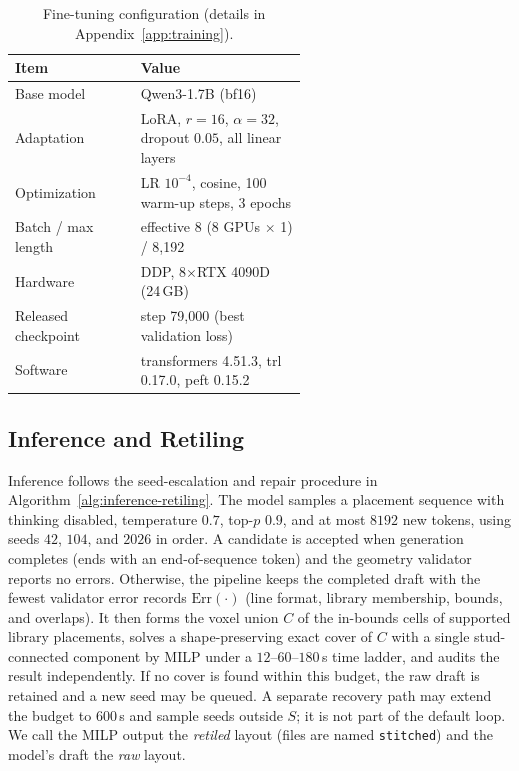 \documentclass[letterpaper]{article} %
\begin{document}
\begin{table}[t]
\centering
\small
\setlength{\tabcolsep}{3pt}
\begin{tabular}{@{}l>{\raggedright\arraybackslash}p{0.58\linewidth}@{}}
\toprule
Item & Value \\
\midrule
Base model & Qwen3-1.7B (bf16) \\
Adaptation & LoRA, $r=16$, $\alpha=32$, dropout $0.05$, all linear layers \\
Optimization & LR $10^{-4}$, cosine, 100 warm-up steps, 3 epochs \\
Batch / max length & effective 8 (8 GPUs $\times$ 1) / 8,192 \\
Hardware & DDP, 8$\times$RTX 4090D (24\,GB) \\
Released checkpoint & step 79,000 (best validation loss) \\
Software & transformers 4.51.3, trl 0.17.0, peft 0.15.2 \\
\bottomrule
\end{tabular}
\caption{Fine-tuning configuration (details in Appendix~\ref{app:training}).}
\label{tab:finetune-config}
\end{table}



\subsection{Inference and Retiling}
Inference follows the seed-escalation and repair procedure in Algorithm~\ref{alg:inference-retiling}. The model samples a placement sequence with thinking disabled, temperature $0.7$, top-$p$ $0.9$, and at most $8192$ new tokens, using seeds $42$, $104$, and $2026$ in order. A candidate is accepted when generation completes (ends with an end-of-sequence token) and the geometry validator reports no errors. Otherwise, the pipeline keeps the completed draft with the fewest validator error records $\mathrm{Err}(\cdot)$ (line format, library membership, bounds, and overlaps). It then forms the voxel union $C$ of the in-bounds cells of supported library placements, solves a shape-preserving exact cover of $C$ with a single stud-connected component by MILP under a $12$--$60$--$180$\,s time ladder, and audits the result independently. If no cover is found within this budget, the raw draft is retained and a new seed may be queued. A separate recovery path may extend the budget to $600$\,s and sample seeds outside $S$; it is not part of the default loop. We call the MILP output the \emph{retiled} layout (files are named \texttt{stitched}) and the model's draft the \emph{raw} layout.
\end{document}
